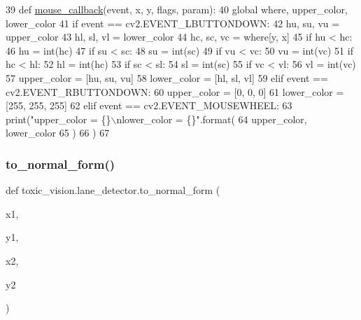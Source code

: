 \begin{DoxyCode}
39 \textcolor{keyword}{def }\mbox{\hyperlink{namespacetoxic__vision_1_1lane__detector_a365ec8dd4fef50dc9623183b3e39e22d}{mouse\_callback}}(event, x, y, flags, param):
40     \textcolor{keyword}{global} where, upper\_color, lower\_color
41     \textcolor{keywordflow}{if} event == cv2.EVENT\_LBUTTONDOWN:
42         hu, su, vu = upper\_color
43         hl, sl, vl = lower\_color
44         hc, sc, vc = where[y, x]
45         \textcolor{keywordflow}{if} hu < hc:
46             hu = int(hc)
47         \textcolor{keywordflow}{if} su < sc:
48             su = int(sc)
49         \textcolor{keywordflow}{if} vu < vc:
50             vu = int(vc)
51         \textcolor{keywordflow}{if} hc < hl:
52             hl = int(hc)
53         \textcolor{keywordflow}{if} sc < sl:
54             sl = int(sc)
55         \textcolor{keywordflow}{if} vc < vl:
56             vl = int(vc)
57         upper\_color = [hu, su, vu]
58         lower\_color = [hl, sl, vl]
59     \textcolor{keywordflow}{elif} event == cv2.EVENT\_RBUTTONDOWN:
60         upper\_color = [0, 0, 0]
61         lower\_color = [255, 255, 255]
62     \textcolor{keywordflow}{elif} event == cv2.EVENT\_MOUSEWHEEL:
63         print(\textcolor{stringliteral}{"upper\_color = \{\}\(\backslash\)nlower\_color = \{\}"}.format(
64             upper\_color, lower\_color
65             )
66             )
67 
\end{DoxyCode}
\mbox{\label{namespacetoxic__vision_1_1lane__detector_ae3bdbfab97718df7c906f65d19f10dfd}} 
\subsubsection{\texorpdfstring{to\+\_\+normal\+\_\+form()}{to\_normal\_form()}}
{\footnotesize\ttfamily def toxic\+\_\+vision.\+lane\+\_\+detector.\+to\+\_\+normal\+\_\+form (\begin{DoxyParamCaption}\item[{}]{x1,  }\item[{}]{y1,  }\item[{}]{x2,  }\item[{}]{y2 }\end{DoxyParamCaption})}


